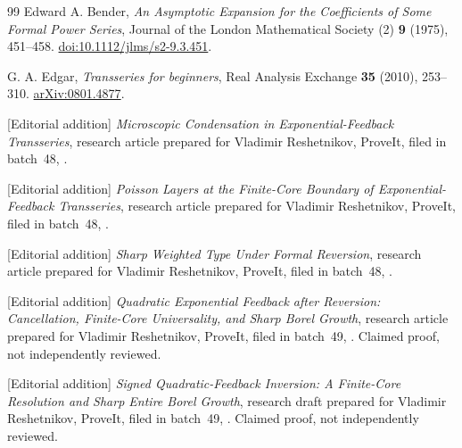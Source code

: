 \documentclass[11pt,a4paper]{article}
\numberwithin{equation}{section}
\theoremstyle{definition}
\theoremstyle{remark}
\begin{document}
\begin{thebibliography}{99}
Edward A. Bender, \emph{An Asymptotic Expansion for the Coefficients of
Some Formal Power Series}, Journal of the London Mathematical Society
(2) \textbf{9} (1975), 451--458.
\href{https://doi.org/10.1112/jlms/s2-9.3.451}{doi:10.1112/jlms/s2-9.3.451}.

G. A. Edgar, \emph{Transseries for beginners}, Real Analysis Exchange
\textbf{35} (2010), 253--310.
\href{https://arxiv.org/abs/0801.4877}{arXiv:0801.4877}.

[Editorial addition] \emph{Microscopic Condensation in Exponential-Feedback
Transseries}, research article prepared for Vladimir Reshetnikov,
ProveIt, filed in batch~48,
.

[Editorial addition] \emph{Poisson Layers at the Finite-Core Boundary of
Exponential-Feedback Transseries},
research article prepared for Vladimir Reshetnikov, ProveIt, filed in
batch~48,
.

[Editorial addition] \emph{Sharp Weighted Type Under Formal Reversion},
research article prepared for Vladimir Reshetnikov, ProveIt, filed in
batch~48,
.

[Editorial addition] \emph{Quadratic Exponential Feedback after Reversion:
Cancellation, Finite-Core Universality, and Sharp Borel Growth}, research
article prepared for Vladimir Reshetnikov, ProveIt, filed in batch~49,
.
Claimed proof, not independently reviewed.

[Editorial addition] \emph{Signed Quadratic-Feedback Inversion: A
Finite-Core Resolution and Sharp Entire Borel Growth}, research draft
prepared for Vladimir Reshetnikov, ProveIt, filed in batch~49,
.
Claimed proof, not independently reviewed.

\end{thebibliography}
\end{document}
